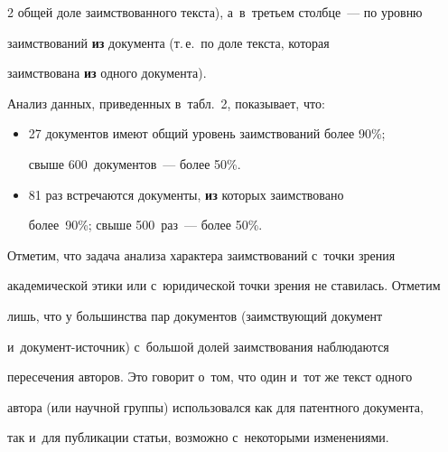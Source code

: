 \begin{multicols}{2}
общей доле заимствованного текста), а~в~третьем столбце~--- по уровню 


заимствований \textbf{из} документа (т.\,е.\ по доле текста, которая 


заимствована \textbf{из} одного документа).


   





  


  Анализ данных, приведенных в~табл.~2, показывает, что:


  \begin{itemize}


  \item 27 документов имеют общий уровень заимствований более 90\%; 


свыше 600~документов~--- более 50\%. 


\item 81 раз встречаются документы, \textbf{из} которых заимствовано 


более~90\%; свыше 500~раз~--- более 50\%.


\end{itemize} 


















  Отметим, что задача анализа характера заимствований с~точки зрения 


академической этики или с~юридической точки зрения не ставилась. Отметим 


лишь, что у большинства пар документов (заимствующий документ  


и~до\-ку\-мент-ис\-точ\-ник) с~большой долей заимствования наблюдаются 


пересечения авторов. Это говорит о~том, что один и~тот же текст одного 


автора (или научной группы) использовался как для патентного документа, 


так и~для публикации статьи, возможно с~некоторыми изменениями. 






\end{multicols}
